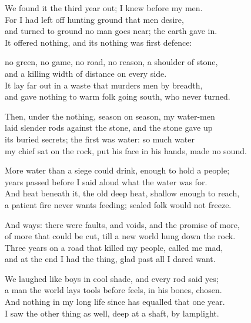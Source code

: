 

\begin{founder}
We found it the third year out; I knew before my men.\\
For I had left off hunting ground that men desire,\\
and turned to ground no man goes near; the earth gave in.\\
It offered nothing, and its nothing was first defence:\\
\medskip

no green, no game, no road, no reason, a shoulder of stone,\\
and a killing width of distance on every side.\\
It lay far out in a waste that murders men by breadth,\\
and gave nothing to warm folk going south, who never turned.\\
\medskip

Then, under the nothing, season on season, my water-men\\
laid slender rods against the stone, and the stone gave up\\
its buried secrets; the first was water: so much water\\
my chief sat on the rock, put his face in his hands, made no sound.\\
\medskip

More water than a siege could drink, enough to hold a people;\\
years passed before I said aloud what the water was for.\\
And heat beneath it, the old deep heat, shallow enough to reach,\\
a patient fire never wants feeding; sealed folk would not freeze.\\
\medskip

And ways: there were faults, and voids, and the promise of more,\\
of more that could be cut, till a new world hung down the rock.\\
Three years on a road that killed my people, called me mad,\\
and at the end I had the thing, glad past all I dared want.\\
\medskip

We laughed like boys in cool shade, and every rod said yes;\\
a man the world lays tools before feels, in his bones, chosen.\\
And nothing in my long life since has equalled that one year.\\
I saw the other thing as well, deep at a shaft, by lamplight.\\
\medskip


\end{founder}
